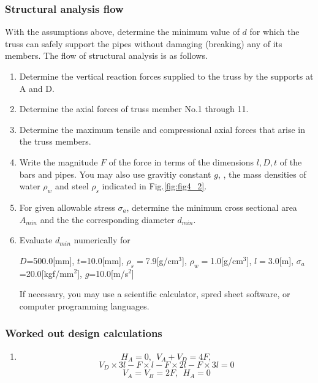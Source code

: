 \documentclass[10pt,a4j]{article}
\begin{document}
\subsubsection{Structural analysis flow}
With the assumptions above, determine the minimum value of $d$ for which the 
truss can safely support the pipes without damaging (breaking) any of its members. 
The flow of structural analysis is as follows.
\begin{enumerate}
\item
	Determine the vertical reaction forces supplied to the truss by the supports at A and D. 
\item
	Determine the axial forces of truss member No.1 through 11. 
\item
	Determine the maximum tensile and compressional axial forces that arise in the truss members. 
\item
	Write the magnitude $F$ of the force in terms of the dimensions 
	$l,D,t$ of the bars and pipes. You may also use gravitiy constant $g$, 
	, the mass densities of water $\rho_w$ and steel $\rho_s$ 
	indicated in Fig.\ref{fig:fig4_2}. 
\item
	For given allowable stress $\sigma_a$, determine the minimum cross sectional 
	area $A_{min}$ and the the corresponding diameter $d_{min}$. 
\item
	Evaluate $d_{min}$ numerically for\\
		\begin{center}
			$D$=500.0[mm], $t$=10.0[mm], 
			$\rho_s=$7.9[g/cm$^3$],
			$\rho_w=$1.0[g/cm$^3$],
			$l=3.0$[m],
			$\sigma_a$=20.0[kgf/mm$^2$], $g$=10.0[m/s$^2$]
		\end{center}
	If necessary, you may use a scientific calculator, spred sheet software, or computer programming languages. 
\end{enumerate}
\subsubsection{Worked out design calculations}
\begin{enumerate}
\item
\begin{equation}
	H_A=0, \ \ V_A+V_D=4F, 
	\label{eqn:}
\end{equation}
\begin{equation}
	V_D\times 3l - F\times l-F\times 2l-F\times 3l=0
	\label{eqn:}
\end{equation}
\begin{equation}
	V_A=V_B=2F, \ \ H_A=0
	\label{eqn:}
\end{equation}
\end{enumerate}
\end{document}
